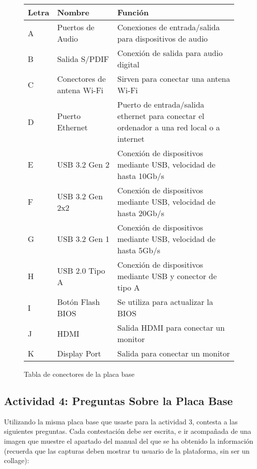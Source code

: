 \begin{enumerate}
    \begin{figure}[ht]

        \vspace{3ex}
        \centering

        \setlength{\tabcolsep}{10pt}
        \renewcommand{\arraystretch}{1.4}

        \begin{tabular}{| m{4em} | m{13em} | m{16em} |}
            \hline
            \textbf{Letra}  & \textbf{Nombre} & \textbf{Función} \\ \hline
            \centering A &  Puertos de Audio & Conexiones de entrada/salida para dispositivos de audio \\ \hline
            \centering B &  Salida S/PDIF  & Conexión de salida para audio digital \\ \hline
            \centering C &  Conectores de antena Wi-Fi & Sirven para conectar una antena Wi-Fi \\ \hline
            \centering D &  Puerto Ethernet & Puerto de entrada/salida ethernet para conectar el ordenador a una red local o a internet \\ \hline
            \centering E &  USB 3.2 Gen 2 & Conexión de dispositivos mediante USB, velocidad de hasta 10Gb/s \\ \hline
            \centering F &  USB 3.2 Gen 2x2 & Conexión de dispositivos mediante USB, velocidad de hasta 20Gb/s \\ \hline
            \centering G &  USB 3.2 Gen 1 & Conexión de dispositivos mediante USB, velocidad de hasta 5Gb/s \\ \hline
            \centering H &  USB 2.0 Tipo A & Conexión de dispositivos mediante USB y conector de tipo A \\ \hline
            \centering I &  Botón Flash BIOS & Se utiliza para actualizar la BIOS \\ \hline
            \centering J &  HDMI & Salida HDMI para conectar un monitor \\ \hline
            \centering K &  Display Port & Salida para conectar un monitor \\
            \hline
        \end{tabular}
        \caption{Tabla de conectores de la placa base}
    \end{figure}
\end{enumerate}

\subsection{Actividad 4: Preguntas Sobre la Placa Base}
Utilizando la misma placa base que usaste para la actividad 3, contesta a las siguientes preguntas. Cada contestación debe ser escrita, e ir acompañada de una imagen que muestre el apartado del manual del que se ha obtenido la información (recuerda que las capturas deben mostrar tu usuario de la plataforma, sin ser un collage):

